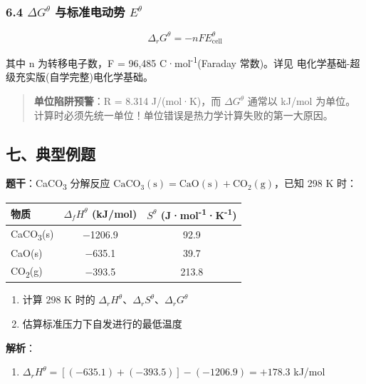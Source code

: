 \documentclass[a4paper,11pt]{ctexart}
\providecommand{\tightlist}{\setlength{\itemsep}{0pt}\setlength{\parskip}{0pt}}
\newcounter{none}
\newcommand{\箭}{\ensuremath{\rightarrow}}
\newcommand{\左箭}{\ensuremath{\leftarrow}}
\newcommand{\上箭}{\ensuremath{\uparrow}}
\newcommand{\下箭}{\ensuremath{\downarrow}}
\newcommand{\衡}{\ensuremath{\rightleftharpoons}}
\newcommand{\双箭}{\ensuremath{\leftrightarrow}}
\newcommand{\约等于}{\ensuremath{\approx}}
\newcommand{\小于等于}{\ensuremath{\leq}}
\newcommand{\大于等于}{\ensuremath{\geq}}
\newcommand{\不等于}{\ensuremath{\neq}}
\newcommand{\西格马}{\ensuremath{\sigma}}
\newcommand{\派}{\ensuremath{\pi}}
\begin{document}
\subsubsection{\texorpdfstring{6.4 \(\Delta G^\theta\) 与标准电动势 \(E^\theta\)}{6.4 \textbackslash Delta G\^{}\textbackslash theta 与标准电动势 E\^{}\textbackslash theta}}\label{delta-gtheta-ux4e0eux6807ux51c6ux7535ux52a8ux52bf-etheta}

\[
\Delta_r G^\theta = -nFE^\theta_{\text{cell}}
\]

其中 n 为转移电子数，F = 96,485 C·mol\textsuperscript{-1}(Faraday 常数)。详见 电化学基础-超级充实版(自学完整)\textbar 电化学基础。

\begin{quote}
\textbf{单位陷阱预警}：R = 8.314 J/(mol·K)，而 \(\Delta G^\theta\) 通常以 kJ/mol 为单位。计算时必须先统一单位！单位错误是热力学计算失败的第一大原因。
\end{quote}

\subsection{七、典型例题}\label{ux4e03ux5178ux578bux4f8bux9898}

\textbf{题干}：CaCO\textsubscript{3} 分解反应 \(\mathrm{CaCO_3(s) = CaO(s) + CO_2(g)}\)，已知 298 K 时：

{\def\LTcaptype{none} %
\begin{longtable}[]{@{}lcc@{}}
\toprule\noalign{}
物质 & \(\Delta_f H^\theta\) (kJ/mol) & \(S^\theta\) (J·mol\textsuperscript{-1}·K\textsuperscript{-1}) \\
\midrule\noalign{}
\endhead
\bottomrule\noalign{}
\endlastfoot
CaCO\textsubscript{3}(s) & −1206.9 & 92.9 \\
CaO(s) & −635.1 & 39.7 \\
CO\textsubscript{2}(g) & −393.5 & 213.8 \\
\end{longtable}
}

\begin{enumerate}
\def\labelenumi{(\arabic{enumi})}
\tightlist
\item
  计算 298 K 时的 \(\Delta_r H^\theta\)、\(\Delta_r S^\theta\)、\(\Delta_r G^\theta\)
\item
  估算标准压力下自发进行的最低温度
\end{enumerate}

\textbf{解析}：

\begin{enumerate}
\def\labelenumi{(\arabic{enumi})}
\tightlist
\item
  \(\Delta_r H^\theta = [(-635.1) + (-393.5)] - (-1206.9) = +178.3\) kJ/mol
\end{enumerate}
\end{document}
